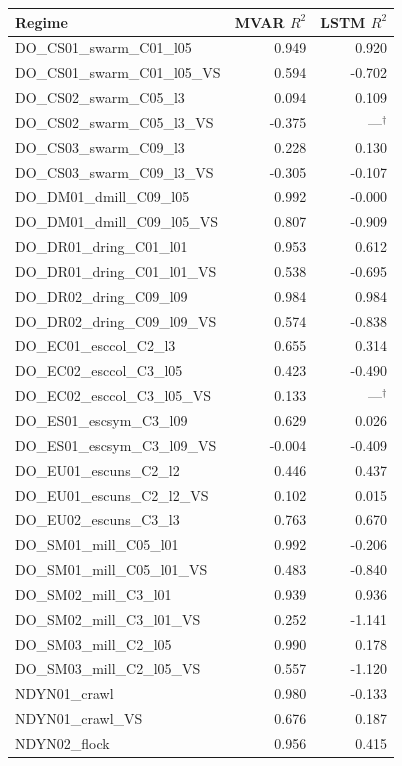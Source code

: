 \scriptsize\setlength{\tabcolsep}{3pt}
\noindent
\begin{minipage}[t]{0.49\textwidth}
\begin{tabular}{@{}lrr@{}}
\hline
Regime & MVAR $R^2$ & LSTM $R^2$ \\
\hline
DO\_CS01\_swarm\_C01\_l05 & 0.949 & 0.920 \\
DO\_CS01\_swarm\_C01\_l05\_VS & 0.594 & -0.702 \\
DO\_CS02\_swarm\_C05\_l3 & 0.094 & 0.109 \\
DO\_CS02\_swarm\_C05\_l3\_VS & -0.375 & ---$^\dagger$ \\
DO\_CS03\_swarm\_C09\_l3 & 0.228 & 0.130 \\
DO\_CS03\_swarm\_C09\_l3\_VS & -0.305 & -0.107 \\
DO\_DM01\_dmill\_C09\_l05 & 0.992 & -0.000 \\
DO\_DM01\_dmill\_C09\_l05\_VS & 0.807 & -0.909 \\
DO\_DR01\_dring\_C01\_l01 & 0.953 & 0.612 \\
DO\_DR01\_dring\_C01\_l01\_VS & 0.538 & -0.695 \\
DO\_DR02\_dring\_C09\_l09 & 0.984 & 0.984 \\
DO\_DR02\_dring\_C09\_l09\_VS & 0.574 & -0.838 \\
DO\_EC01\_esccol\_C2\_l3 & 0.655 & 0.314 \\
DO\_EC02\_esccol\_C3\_l05 & 0.423 & -0.490 \\
DO\_EC02\_esccol\_C3\_l05\_VS & 0.133 & ---$^\dagger$ \\
DO\_ES01\_escsym\_C3\_l09 & 0.629 & 0.026 \\
DO\_ES01\_escsym\_C3\_l09\_VS & -0.004 & -0.409 \\
DO\_EU01\_escuns\_C2\_l2 & 0.446 & 0.437 \\
DO\_EU01\_escuns\_C2\_l2\_VS & 0.102 & 0.015 \\
DO\_EU02\_escuns\_C3\_l3 & 0.763 & 0.670 \\
DO\_SM01\_mill\_C05\_l01 & 0.992 & -0.206 \\
DO\_SM01\_mill\_C05\_l01\_VS & 0.483 & -0.840 \\
DO\_SM02\_mill\_C3\_l01 & 0.939 & 0.936 \\
DO\_SM02\_mill\_C3\_l01\_VS & 0.252 & -1.141 \\
DO\_SM03\_mill\_C2\_l05 & 0.990 & 0.178 \\
DO\_SM03\_mill\_C2\_l05\_VS & 0.557 & -1.120 \\
NDYN01\_crawl & 0.980 & -0.133 \\
NDYN01\_crawl\_VS & 0.676 & 0.187 \\
NDYN02\_flock & 0.956 & 0.415 \\
\hline
\end{tabular}
\end{minipage}\hfill

